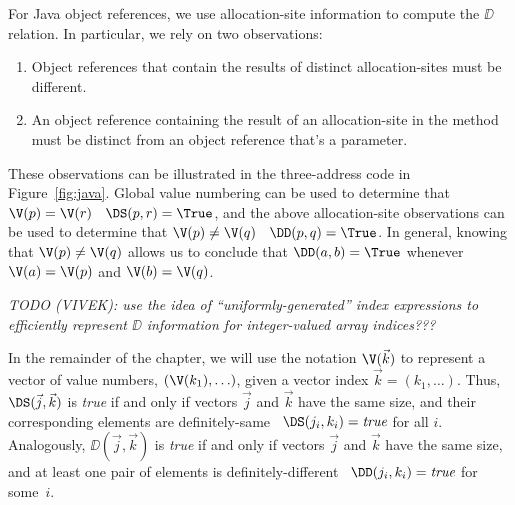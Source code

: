 {For Java object references, we use allocation-site information to compute
the $\DD$ relation.  In particular, we rely on two observations:
\begin{enumerate}
\item Object references that contain the results of distinct allocation-sites
must be different.
\item An object reference containing the result of an allocation-site
in the method must be distinct from an object reference that's a parameter.
\end{enumerate}
These observations can be illustrated in the three-address code in
Figure~\ref{fig:java}.  Global value numbering can be used to
determine that $\V(p) = \V(r)$ \ie\ $\DS(p,r) = \True$,
and the above allocation-site observations can be used to determine
that $\V(p) \not= \V(q)$ \ie\ $\DD(p,q) = \True$.
In general, knowing that $\V(p) \not= \V(q)$ allows
us to conclude that $\DD(a,b) = \True$ whenever 
$\V(a) = \V(p)$ and $\V(b) = \V(q)$.



{\it
TODO (VIVEK): use the idea of ``uniformly-generated'' index expressions to efficiently
represent $\DD$ information for integer-valued array indices???
}

}

In the remainder of the chapter,
we will use the notation $\V(\vec{k})$ to represent a vector
of value numbers, $(\V(k_1), \ldots)$, 
given a vector index $\vec{k} = (k_1,
\ldots)$.
Thus, $\DS(\vec{j}, \vec{k})$
is {\it true} if and only if vectors $\vec{j}$ and $\vec{k}$ have the
same size, and their corresponding elements are definitely-same \ie\
$\DS(j_i,k_i )= \mbox{\it true}$ for all $i$.  Analogously,
$\DD(\vec{j}, \vec{k})$ is {\it true} if and only if vectors $\vec{j}$
and $\vec{k}$ have the same size, and at least one pair of elements is
definitely-different \ie\ $\DD(j_i,k_i )= \mbox{\it true}$ for some~$i$.
